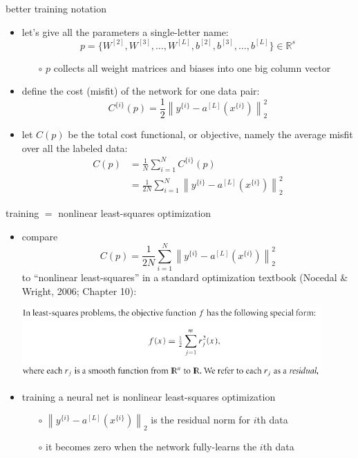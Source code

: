 \documentclass[xcolor={svgnames},
               hyperref={colorlinks,citecolor=DeepPink4,linkcolor=FireBrick,urlcolor=Maroon}]
               {beamer}
\newcommand{\RR}{\mathbb{R}}
\begin{document}
\begin{frame}{better training notation}

\begin{itemize}
\item let's give all the parameters a single-letter name:
   $$p = \{W^{[2]},W^{[3]},\dots,W^{[L]},b^{[2]},b^{[3]},\dots,b^{[L]}\} \in \RR^s$$

    \begin{itemize}
    \item[$\circ$] $p$ collects all weight matrices and biases into one big column vector
    \end{itemize}
\item define the cost (misfit) of the network for one data pair:
    $$C^{\{i\}}(p) = \frac{1}{2} \left\|y^{\{i\}} - a^{[L]}(x^{\{i\}})\right\|_2^2$$
\item let $C(p)$ be the total \alert{cost functional}, or \alert{objective}, namely the \alert{average} misfit over all the labeled data:
\begin{align*}
C(p) &= \frac{1}{N} \sum_{i=1}^N C^{\{i\}}(p) \\
     &= \frac{1}{2N} \sum_{i=1}^N \left\|y^{\{i\}} - a^{[L]}(x^{\{i\}})\right\|_2^2
\end{align*}
\end{itemize}
\end{frame}


\begin{frame}{training $=$ nonlinear least-squares optimization}

\begin{itemize}
\item compare
    $$C(p) = \frac{1}{2N} \sum_{i=1}^N \left\|y^{\{i\}} - a^{[L]}(x^{\{i\}})\right\|_2^2$$
to ``nonlinear least-squares'' in a standard optimization textbook (Nocedal \& Wright, 2006; Chapter 10):

\medskip
\includegraphics[width=0.9\textwidth]{figs/nls}

\medskip
\item training a neural net is \alert{nonlinear least-squares optimization}
    \begin{itemize}
    \item[$\circ$] $\left\|y^{\{i\}} - a^{[L]}(x^{\{i\}})\right\|_2$ is the \alert{residual norm} for $i$th data
    \item[$\circ$] it becomes zero when the network fully-learns the $i$th data
    \end{itemize}
\end{itemize}
\end{frame}
\end{document}
